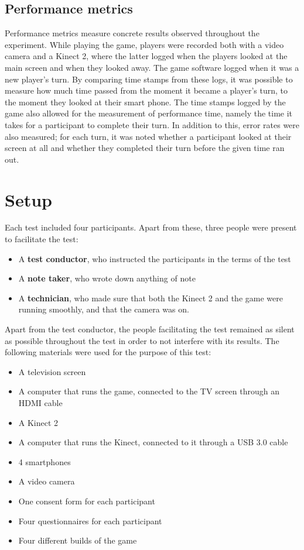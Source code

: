 \subsection{Performance metrics}\label{subsec:performance_metrics}
Performance metrics measure concrete results observed throughout the experiment. While playing the game, players were recorded both with a video camera and a Kinect 2, where the latter logged when the players looked at the main screen and when they looked away. The game software logged when it was a new player's turn. By comparing time stamps from these logs, it was possible to measure how much time passed from the moment it became a player's turn, to the moment they looked at their smart phone. The time stamps logged by the game also allowed for the measurement of performance time, namely the time it takes for a participant to complete their turn. In addition to this, error rates were also measured; for each turn, it was noted whether a participant looked at their screen at all	 and whether they completed their turn before the given time ran out. 

\section{Setup}
Each test included four participants. Apart from these, three people were present to facilitate the test:

\begin{itemize}
	\item A \textbf{test conductor}, who instructed the participants in the terms of the test
	\item A \textbf{note taker}, who wrote down anything of note
	\item A \textbf{technician}, who made sure that both the Kinect 2 and the game were running smoothly, and that the camera was on.
\end{itemize}

Apart from the test conductor, the people facilitating the test remained as silent as possible throughout the test in order to not interfere with its results. The following materials were used for the purpose of this test:

\begin{itemize}
	\item A television screen
	\item A computer that runs the game, connected to the TV screen through an HDMI cable
	\item A Kinect 2
	\item A computer that runs the Kinect, connected to it through a USB 3.0 cable
	\item 4 smartphones
	\item A video camera
	\item One consent form for each participant
	\item Four questionnaires for each participant
	\item Four different builds of the game
\end{itemize}

